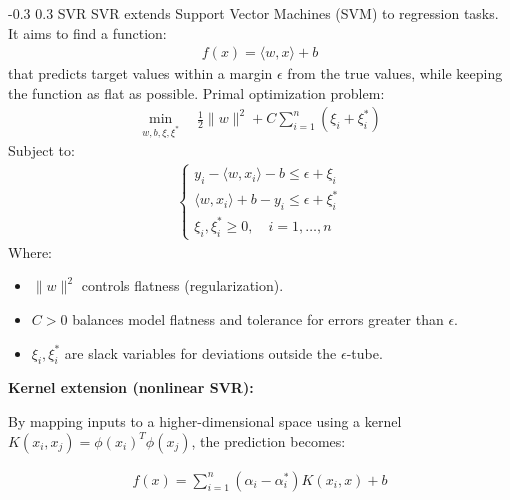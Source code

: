 \documentclass[twocolumn]{llncs}
\makeatletter
\renewcommand{\subsection}{\@startsection{subsection}{2}{\z@}%
  {-0.3\baselineskip}  %
  {0.3\baselineskip}   %
  {\normalfont\normalsize\bfseries}}
\makeatother
\begin{document}
\subsection{SVR}
SVR extends Support Vector Machines (SVM) to regression tasks. It aims to find a function:
\begin{align}
    f(x) = \langle w, x \rangle + b
\end{align}
that predicts target values within a margin \(\epsilon\) from the true values, while keeping the function as flat as possible. 
\noindent Primal optimization problem:
\begin{align}
    \min_{w,b,\xi,\xi^*} \quad \frac{1}{2} \|w\|^2 + C \sum_{i=1}^n (\xi_i + \xi_i^*)
\end{align}
Subject to:
\begin{align}
    \begin{cases}
        y_i - \langle w, x_i \rangle - b \leq \epsilon + \xi_i \\
        \langle w, x_i \rangle + b - y_i \leq \epsilon + \xi_i^* \\
        \xi_i, \xi_i^* \geq 0, \quad i=1, \ldots, n
    \end{cases}
\end{align}
Where:
\begin{itemize}
    \item \(\|w\|^2\) controls flatness (regularization).
    \item \(C > 0\) balances model flatness and tolerance for errors greater than \(\epsilon\).
    \item \(\xi_i, \xi_i^*\) are slack variables for deviations outside the \(\epsilon\)-tube.
\end{itemize}
\textbf{Kernel extension (nonlinear SVR):}

\noindent By mapping inputs to a higher-dimensional space using a kernel \(K(x_i, x_j) = \phi(x_i)^T \phi(x_j)\), the prediction becomes:

\begin{align}
    f(x) = \sum_{i=1}^n (\alpha_i - \alpha_i^*) K(x_i, x) + b
\end{align}

\end{document}
